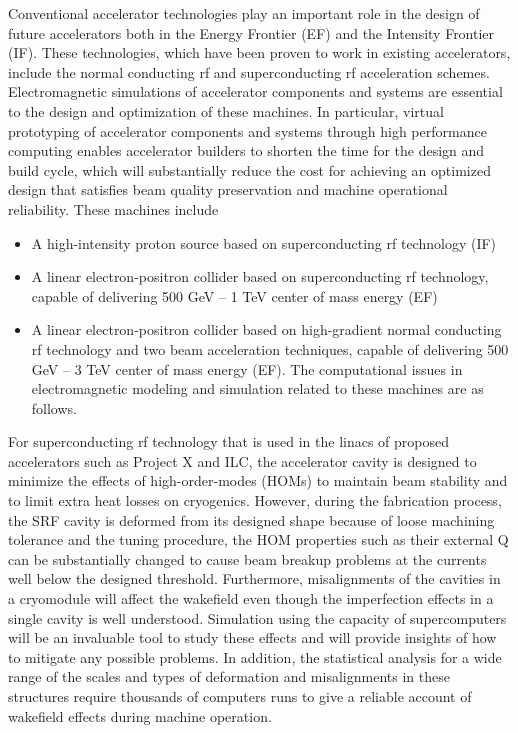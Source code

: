 Conventional accelerator technologies play an important role in
the design of future accelerators both in the Energy Frontier
(EF) and the Intensity Frontier (IF). These technologies, which
have been proven to work in existing accelerators, include the
normal conducting rf and superconducting rf acceleration schemes.
Electromagnetic simulations of accelerator components and systems
are essential to the design and optimization of these machines.
In particular, virtual prototyping of accelerator components and
systems through high performance computing enables accelerator
builders to shorten the time for the design and build cycle,
which will substantially reduce the cost for achieving an
optimized design that satisfies beam quality preservation and
machine operational reliability. These machines include

\begin{itemize}
 \item A high-intensity proton source based on superconducting rf
   technology (IF)
 \item A linear electron-positron collider based on superconducting
   rf technology, capable of delivering 500 GeV -- 1 TeV center of
   mass energy (EF)
 \item A linear electron-positron collider based on high-gradient
   normal conducting rf technology and two beam acceleration techniques,
   capable of delivering 500 GeV -- 3 TeV center of mass energy (EF).
   The computational issues in electromagnetic modeling and simulation
   related to these machines are as follows.
\end{itemize}

For superconducting rf technology that is used in the linacs of
proposed accelerators such as Project X and ILC, the accelerator
cavity is designed to minimize the effects of high-order-modes
(HOMs) to maintain beam stability and to limit extra heat losses
on cryogenics. However, during the fabrication process, the SRF
cavity is deformed from its designed shape because of loose
machining tolerance and the tuning procedure, the HOM properties
such as their external Q can be substantially changed to cause
beam breakup problems at the currents well below the
designed threshold. Furthermore, misalignments of the cavities in
a cryomodule will affect the wakefield even though the
imperfection effects in a single cavity is well understood.
Simulation using the capacity of supercomputers will be an
invaluable tool to study these effects and will provide insights
of how to mitigate any possible problems.  In addition, the
 statistical analysis for a wide range of the scales and
types of deformation and misalignments in these structures
require thousands of computers runs to give a reliable account of
wakefield effects during machine operation.

